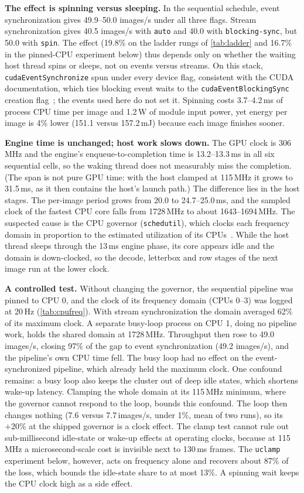 \textbf{The effect is spinning versus sleeping.}
In the sequential schedule, event synchronization gives 49.9--50.0
images/s under all three flags. Stream synchronization gives 40.5 images/s
with \texttt{auto} and 40.0 with \texttt{blocking-sync}, but 50.0 with
\texttt{spin}. The effect (19.8\% on the ladder rungs of \cref{tab:ladder}
and 16.7\% in the pinned-CPU experiment below) thus depends only on
whether the waiting host thread spins or sleeps, not on events versus
streams. On this stack, \texttt{cudaEventSynchronize} spun
under every device flag, consistent with the CUDA documentation, which
ties blocking event waits to the \texttt{cudaEventBlockingSync} creation
flag~\cite{nvidia2024cuda}; the events used here do not set it.
Spinning costs 3.7--4.2\,ms of process CPU time
per image and 1.2\,W of module input power, yet energy per image is 4\%
lower (151.1 versus 157.2\,mJ) because each image finishes sooner.

\textbf{Engine time is unchanged; host work slows down.}
The GPU clock is 306\,MHz and the engine's enqueue-to-completion time
is 13.2--13.3\,ms in all six sequential cells, so the waking thread does
not measurably miss the completion. (The span is not pure GPU time:
with the host clamped at 115\,MHz it grows to 31.5\,ms, as it then
contains the host's launch path.) The difference lies
in the host stages. The per-image period grows from 20.0 to
24.7--25.0\,ms, and the sampled clock of the fastest CPU core falls from
1728\,MHz to about 1643--1694\,MHz. The suspected cause is the CPU
governor (\texttt{schedutil}), which clocks each frequency domain in
proportion to the estimated utilization of its
CPUs~\cite{linux2024cpufreq}. While the host thread sleeps through the
13\,ms engine phase, its core appears idle and the domain is
down-clocked, so the decode, letterbox and row stages of the next image
run at the lower clock.

\textbf{A controlled test.}
Without changing the governor, the sequential pipeline was pinned to
CPU 0, and the clock of its frequency domain (CPUs 0--3) was logged at
20\,Hz (\cref{tab:cpufreq}). With stream synchronization the domain
averaged 62\% of its maximum clock. A separate busy-loop process on
CPU 1, doing no pipeline work, holds the shared domain at 1728\,MHz.
Throughput then rose to 49.0 images/s, closing 97\% of the gap to event
synchronization (49.2 images/s), and the pipeline's own CPU time fell. The busy loop had no
effect on the event-synchronized pipeline, which already held the
maximum clock. One confound remains: a busy loop also keeps the
cluster out of deep idle states, which shortens wake-up latency. Clamping the whole domain at its 115\,MHz minimum, where the
governor cannot respond to the loop, bounds this confound. The loop then
changes nothing (7.6 versus 7.7\,images/s, under 1\%, mean of two
runs), so its $+20$\% at the shipped governor is a clock effect. The
clamp test cannot rule out sub-millisecond idle-state or wake-up effects
at operating clocks, because at 115\,MHz a microsecond-scale cost is
invisible next to 130\,ms frames. The \texttt{uclamp} experiment below, however, acts
on frequency alone and recovers about 87\% of the loss, which bounds the
idle-state share to at most 13\%. A spinning wait keeps the CPU clock
high as a side effect.

